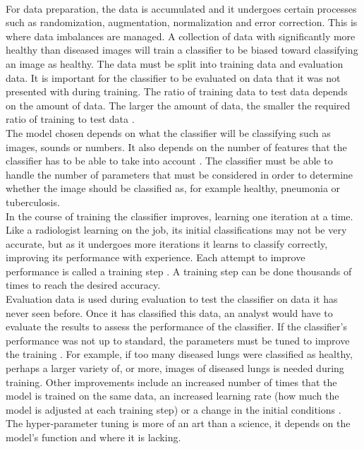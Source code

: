 \\
For data preparation, the data is accumulated and it undergoes certain processes such as randomization, augmentation, normalization and error correction. This is where data imbalances are managed. A collection of data with significantly more healthy than diseased images will train a classifier to be biased toward classifying an image as healthy. The data must be split into training data and evaluation data. It is important for the classifier to be evaluated on data that it was not presented with during training. The ratio of training data to test data depends on the amount of data. The larger the amount of data, the smaller the required ratio of training to test data \cite{14}.\newline
\\
The model chosen depends on what the classifier will be classifying such as images, sounds or numbers. It also depends on the number of features that the classifier has to be able to take into account \cite{13}. The classifier must be able to handle the number of parameters that must be considered in order to determine whether the image should be classified as, for example healthy, pneumonia or tuberculosis. \newline
\\
In the course of training the classifier improves, learning one iteration at a time. Like a radiologist learning on the job, its initial classifications may not be very accurate, but as it undergoes more iterations it learns to classify correctly, improving its performance with experience. Each attempt to improve performance is called a training step \cite{14}. A training step can be done thousands of times to reach the desired accuracy. \newline
\\
Evaluation data is used during evaluation to test the classifier on data it has never seen before. Once it has classified this data, an analyst would have to evaluate the results to assess the performance of the classifier.
If the classifier’s performance was not up to standard, the parameters must be tuned to improve the training \cite{14}. For example, if too many diseased lungs were classified as healthy, perhaps a larger variety of, or more, images of diseased lungs is needed during training. Other improvements include an increased number of times that the model is trained on the same data, an increased learning rate (how much the model is adjusted at each training step) or a change in the initial conditions \cite{14}. The hyper-parameter tuning is more of an art than a science, it depends on the model’s function and where it is lacking.\newline
